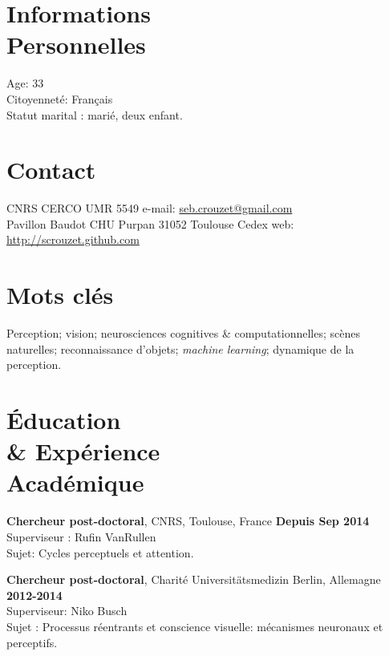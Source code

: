 \documentclass[margin,line]{resume}
\begin{document}
\begin{resume}

\section{\mysidestyle Informations\\Personnelles}
    Age: 33\\
    Citoyenneté: Français\\
    Statut marital : marié, deux enfant.

\vspace{3mm}
\section{\mysidestyle Contact}
CNRS CERCO UMR 5549             \hfill e-mail: \href{mailto:seb.crouzet@gmail.com}{seb.crouzet@gmail.com} \\
Pavillon Baudot CHU Purpan 31052 Toulouse Cedex      \hfill web: \url{http://scrouzet.github.com} 
    

\vspace{3mm}
\section{\mysidestyle Mots clés}
    Perception; vision; neurosciences cognitives \& computationnelles; scènes naturelles; reconnaissance d'objets; \emph{machine learning}; dynamique de la perception.
    
\vspace{3mm}
\section{\mysidestyle \'Education \\ \& Expérience \\ Académique}
    
    
  \textbf{Chercheur post-doctoral}, CNRS, Toulouse, France \hfill \textbf{Depuis Sep 2014}\\
    	Superviseur : Rufin VanRullen\\
    	Sujet: Cycles perceptuels et attention.
    	\vspace{-1.5mm}
    
  \textbf{Chercheur post-doctoral}, Charité Universitätsmedizin Berlin, Allemagne \hfill \textbf{2012-2014}\\
	Superviseur: Niko Busch\\
	Sujet : Processus réentrants et conscience visuelle: mécanismes neuronaux et perceptifs.
	\vspace{-1.5mm}
	

\end{resume}
\end{document}
